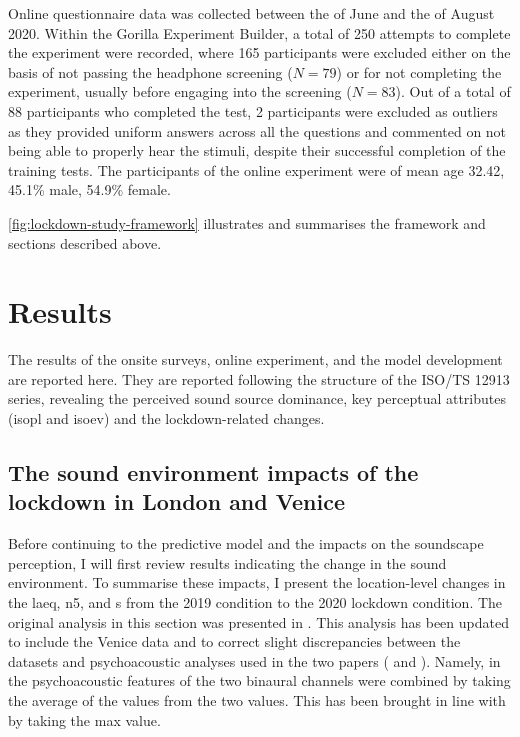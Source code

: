    Online questionnaire data was collected between the  of June and the  of August 2020. Within the Gorilla Experiment Builder, a total of 250 attempts to complete the experiment were recorded, where 165 participants were excluded either on the basis of not passing the headphone screening ($N=79$) or for not completing the experiment, usually before engaging into the screening ($N=83$). Out of a total of 88 participants who completed the test, 2 participants were excluded as outliers as they provided uniform answers across all the questions and commented on not being able to properly hear the stimuli, despite their successful completion of the training tests. The participants of the online experiment were of mean age 32.42, 45.1\% male, 54.9\% female.

   \cref{fig:lockdown-study-framework} illustrates and summarises the framework and sections described above.

\section{Results}

 The results of the onsite surveys, online experiment, and the model development are reported here. They are reported following the structure of the ISO/TS 12913 series, revealing the perceived sound source dominance, key perceptual attributes (\gls{isopl} and \gls{isoev}) and the lockdown-related changes.

\subsection{The sound environment impacts of the lockdown in London and Venice}
\label{sec:LondonLockdown}

Before continuing to the predictive model and the impacts on the soundscape perception, I will first review results indicating the change in the sound environment. To summarise these impacts, I present the location-level changes in the \gls{laeq}, \gls{n5}, and \gls{s} from the 2019 condition to the 2020 lockdown condition. The original analysis in this section was presented in \citet{Aletta2020Assessing}. This analysis has been updated to include the Venice data and to correct slight discrepancies between the datasets and psychoacoustic analyses used in the two papers (\citet{Aletta2020Assessing} and \citet{Mitchell2021Investigating}). Namely, in \citet{Aletta2020Assessing} the psychoacoustic features of the two binaural channels were combined by taking the average of the values from the two values. This has been brought in line with \citet{Mitchell2021Investigating} by taking the max value.

